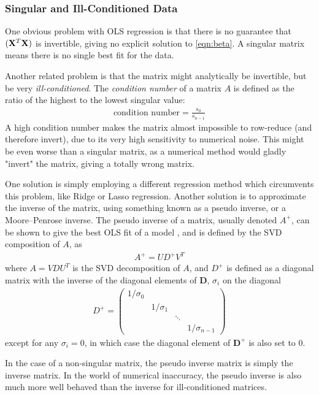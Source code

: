 \documentclass[10pt, twocolumn]{article}
\renewcommand{\b}{\boldsymbol}
\begin{document}
\subsubsection{Singular and Ill-Conditioned Data}
\label{subsec:singularity}
One obvious problem with OLS regression is that there is no guarantee that $(\vb{X}^T \vb{X})$ is invertible, giving no explicit solution to \cref{eqn:beta}. A singular matrix means there is no single best fit for the data.

Another related problem is that the matrix might analytically be invertible, but be very \textit{ill-conditioned}. The \textit{condition number} of a matrix $A$ is defined as the ratio of the highest to the lowest singular value:
\begin{align}
    \text{condition number} = \frac{s_0}{s_{n-1}}
\end{align}
A high condition number makes the matrix almost impossible to row-reduce (and therefore invert), due to its very high sensitivity to numerical noise. This might be even worse than a singular matrix, as a numerical method would gladly "invert" the matrix, giving a totally wrong matrix.

One solution is simply employing a different regression method which circumvents this problem, like Ridge or Lasso regression. Another solution is to approximate the inverse of the matrix, using something known as a pseudo inverse, or a Moore–Penrose inverse. The pseudo inverse of a matrix, usually denoted $A^+$, can be shown to give the best OLS fit of a model \citep{penrose_1956}, and is defined by the SVD composition of $A$, as 
\begin{align}
    A^+ = UD^+V^T
\end{align}
where $A = VDU^T$ is the SVD decomposition of $A$, and $D^+$ is defined as a diagonal matrix with the inverse of the diagonal elements of $\b D$, $\sigma_i$ on the diagonal
\begin{align}
    D^+ = \begin{pmatrix}
    1/\sigma_0 & & \\
    & 1/\sigma_1 & \\
     & & \ddots & \\
    & & & 1/\sigma_{n-1}
    \end{pmatrix}
\end{align}
except for any $\sigma_i = 0$, in which case the diagonal element of $\b D^+$ is also set to 0.

In the case of a non-singular matrix, the pseudo inverse matrix is simply the inverse matrix. In the world of numerical inaccuracy, the pseudo inverse is also much more well behaved than the inverse for ill-conditioned matrices.
\end{document}
